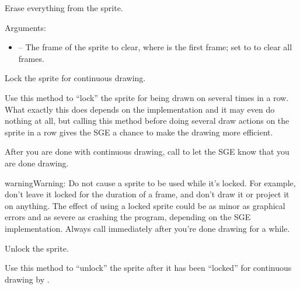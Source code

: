 \documentclass[letterpaper,10pt,english]{sphinxmanual}
\begin{document}

\begin{fulllineitems}
\label{gfx:sge.gfx.Sprite.draw_clear}
Erase everything from the sprite.

Arguments:
\begin{itemize}
\item {} 
 -- The frame of the sprite to clear, where  is
the first frame; set to  to clear all frames.

\end{itemize}

\end{fulllineitems}


\begin{fulllineitems}
\label{gfx:sge.gfx.Sprite.draw_lock}
Lock the sprite for continuous drawing.

Use this method to ``lock'' the sprite for being drawn on several
times in a row.  What exactly this does depends on the
implementation and it may even do nothing at all, but calling
this method before doing several draw actions on the sprite in a
row gives the SGE a chance to make the drawing more efficient.

After you are done with continuous drawing, call
{\hyperref[gfx:sge.gfx.Sprite.draw_unlock]{\emph{}}} to let the SGE know that you are done
drawing.

\begin{notice}{warning}{Warning:}
Do not cause a sprite to be used while it's locked.  For
example, don't leave it locked for the duration of a frame,
and don't draw it or project it on anything.  The effect of
using a locked sprite could be as minor as graphical errors
and as severe as crashing the program, depending on the SGE
implementation.  Always call {\hyperref[gfx:sge.gfx.Sprite.draw_unlock]{\emph{}}} immediately
after you're done drawing for a while.
\end{notice}

\end{fulllineitems}


\begin{fulllineitems}
\label{gfx:sge.gfx.Sprite.draw_unlock}
Unlock the sprite.

Use this method to ``unlock'' the sprite after it has been
``locked'' for continuous drawing by {\hyperref[gfx:sge.gfx.Sprite.draw_lock]{\emph{}}}.

\end{fulllineitems}
\end{document}
